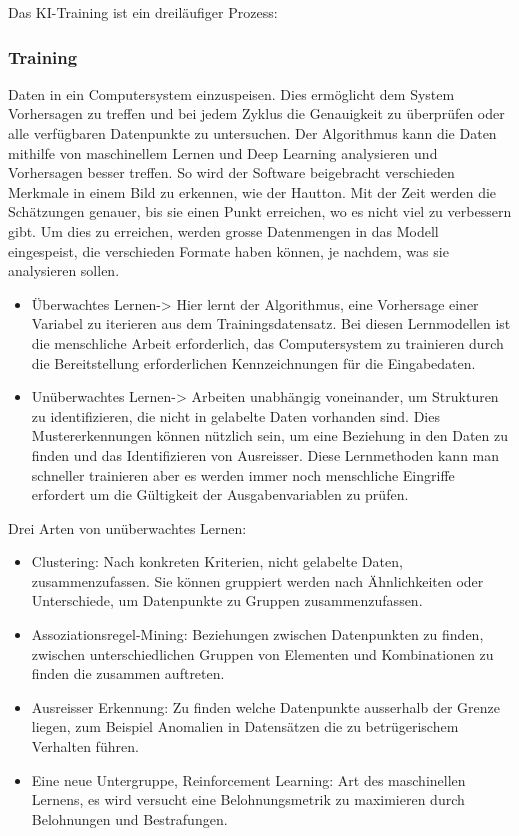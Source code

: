 \documentclass{report}
\begin{document}
 
Das KI-Training ist ein dreiläufiger Prozess:


\subsubsection{Training} Daten in ein Computersystem einzuspeisen. Dies ermöglicht dem System Vorhersagen zu treffen und bei jedem Zyklus die Genauigkeit zu überprüfen oder alle verfügbaren Datenpunkte zu untersuchen. Der Algorithmus kann die Daten mithilfe von maschinellem Lernen und Deep Learning analysieren und Vorhersagen besser treffen. So wird der Software beigebracht verschieden Merkmale in einem Bild zu erkennen, wie der Hautton. Mit der Zeit werden die Schätzungen genauer, bis sie einen Punkt erreichen, wo es nicht viel zu verbessern gibt.
Um dies zu erreichen, werden grosse Datenmengen in das Modell eingespeist, die verschieden Formate haben können, je nachdem, was sie analysieren sollen.

\begin{itemize}
    \item Überwachtes Lernen-> Hier lernt der Algorithmus, eine Vorhersage einer Variabel zu iterieren aus dem Trainingsdatensatz. Bei diesen Lernmodellen ist die menschliche Arbeit erforderlich, das Computersystem zu trainieren durch die Bereitstellung erforderlichen Kennzeichnungen für die Eingabedaten.
    \item Unüberwachtes Lernen-> Arbeiten unabhängig voneinander, um Strukturen zu identifizieren, die nicht in gelabelte Daten vorhanden sind. Dies Mustererkennungen können nützlich sein, um eine Beziehung in den Daten zu finden und das Identifizieren von Ausreisser. Diese Lernmethoden kann man schneller trainieren aber es werden immer noch menschliche Eingriffe erfordert um die Gültigkeit der Ausgabenvariablen zu prüfen.
\end{itemize}

Drei Arten von unüberwachtes Lernen:
\begin{itemize}
    \item Clustering: Nach konkreten Kriterien, nicht gelabelte Daten, zusammenzufassen. Sie können gruppiert werden nach Ähnlichkeiten oder Unterschiede, um Datenpunkte zu Gruppen zusammenzufassen.  
    \item Assoziationsregel-Mining: Beziehungen zwischen Datenpunkten zu finden, zwischen unterschiedlichen Gruppen von Elementen und Kombinationen zu finden die zusammen auftreten.
    \item Ausreisser Erkennung: Zu finden welche Datenpunkte ausserhalb der Grenze liegen, zum Beispiel Anomalien in Datensätzen die zu betrügerischem Verhalten führen.
    \item Eine neue Untergruppe, Reinforcement Learning: Art des maschinellen Lernens, es wird versucht eine Belohnungsmetrik zu maximieren durch Belohnungen und Bestrafungen.
\end{itemize}
\end{document}
